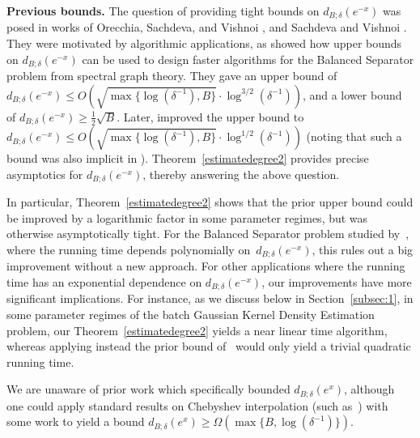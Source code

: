 \documentclass[10pt,a4paper]{article}
\theoremstyle{plain}\newtheorem{theorem}{Theorem}
\theoremstyle{definition}
\begin{document}
 \textbf{Previous bounds.} The question of providing tight bounds on $d_{B; \delta} (e^{-x})$ was posed in works of Orecchia, Sachdeva, and Vishnoi \cite[Sections 4 and 7]{orecchia2012approximating}, and Sachdeva and Vishnoi \cite[Section 5]{sachdeva2014faster}. They were motivated by algorithmic applications, as \cite{orecchia2012approximating} showed how upper bounds on $d_{B; \delta} (e^{-x})$ can be used to design faster algorithms for the Balanced Separator problem from spectral graph theory. They gave an upper bound of $d_{B; \delta} (e^{-x}) \leq O(\sqrt{\max \{ \log (\delta^{-1}), B \}} \cdot \log^{3/2} (\delta^{-1}))$, and a lower bound of $d_{B; \delta} (e^{-x}) \geq \frac12 \sqrt{B}$. Later, \cite{sachdeva2014faster} improved the upper bound to $d_{B; \delta} (e^{-x}) \leq O(\sqrt{\max \{ \log (\delta^{-1}), B \}} \cdot \log^{1/2} (\delta^{-1}))$ (noting that such a bound was also implicit in \cite{hochbruck1997krylov}). Theorem~\ref{estimatedegree2} provides precise asymptotics for $d_{B; \delta} (e^{-x})$, thereby answering the above question.
 
 In particular, Theorem~\ref{estimatedegree2} shows that the prior upper bound could be improved by a logarithmic factor in some parameter regimes, but was otherwise asymptotically tight. For the Balanced Separator problem studied by~\cite{orecchia2012approximating}, where the running time depends polynomially on~$d_{B; \delta} (e^{-x})$, this rules out a big improvement without a new approach. For other applications where the running time has an exponential dependence on $d_{B; \delta} (e^{-x})$, our improvements have more significant implications. For instance, as we discuss below in Section~\ref{subsec:1}, in some parameter regimes of the batch Gaussian Kernel Density Estimation problem, our Theorem~\ref{estimatedegree2} yields a near linear time algorithm, whereas applying instead the prior bound of~\cite{sachdeva2014faster} would only yield a trivial quadratic running time.
 
 We are unaware of prior work which specifically bounded $d_{B; \delta} (e^{x})$, although one could apply standard results on Chebyshev interpolation (such as~\cite[{Theorem 8.2}]{AT}) with some work to yield a bound $d_{B; \delta} (e^{x}) \geq \Omega(\max\{B, \log(\delta^{-1}) \})$.\\
\end{document}
